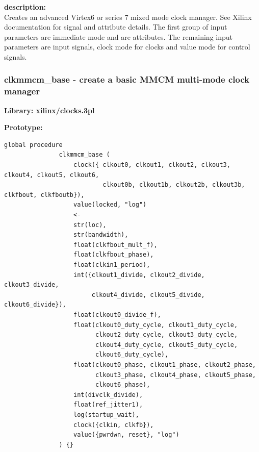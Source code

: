             {\bf description:} \\
            Creates an advanced Virtex6 or series 7 mixed mode clock manager. See Xilinx
            documentation for signal and attribute details. The first group of input
            parameters are immediate mode and are attributes. The remaining input
            parameters are input signals, clock mode for clocks and value mode for
            control signals.

        \subsubsection{clkmmcm\_base - create a basic MMCM multi-mode clock manager }\label{sec:lpmmcmb}
            
            {\bf Library: xilinx/clocks.3pl}

            {\bf Prototype:} \\
            \vsp
            \begin{lstlisting}[gobble=12, language=threepl]
               global procedure
               clkmmcm_base (
                   clock({ clkout0, clkout1, clkout2, clkout3, clkout4, clkout5, clkout6,
                           clkout0b, clkout1b, clkout2b, clkout3b, clkfbout, clkfboutb}),
                   value(locked, "log")
                   <-
                   str(loc),
                   str(bandwidth),
                   float(clkfbout_mult_f),
                   float(clkfbout_phase),
                   float(clkin1_period),
                   int({clkout1_divide, clkout2_divide, clkout3_divide,
                        clkout4_divide, clkout5_divide, clkout6_divide}),
                   float(clkout0_divide_f),
                   float(clkout0_duty_cycle, clkout1_duty_cycle,
                         clkout2_duty_cycle, clkout3_duty_cycle,
                         clkout4_duty_cycle, clkout5_duty_cycle,
                         clkout6_duty_cycle),
                   float(clkout0_phase, clkout1_phase, clkout2_phase,
                         clkout3_phase, clkout4_phase, clkout5_phase,
                         clkout6_phase),
                   int(divclk_divide),
                   float(ref_jitter1),
                   log(startup_wait),
                   clock({clkin, clkfb}),
                   value({pwrdwn, reset}, "log")
               ) {}
            \end{lstlisting}

